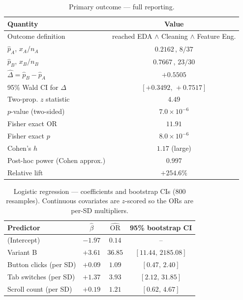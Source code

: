 \documentclass[11pt,a4paper]{article}
\begin{document}
\begin{table}[ht]
\centering\small
\renewcommand{\arraystretch}{1.15}
\caption{Primary outcome — full reporting.}
\begin{tabular}{@{}lc@{}}
\toprule
Quantity & Value \\
\midrule
Outcome definition              & reached EDA $\wedge$ Cleaning $\wedge$ Feature Eng. \\
$\hat p_A$, $x_A/n_A$           & $0.2162$\,, $8/37$ \\
$\hat p_B$, $x_B/n_B$           & $0.7667$\,, $23/30$ \\
$\hat\Delta = \hat p_B-\hat p_A$ & $+0.5505$ \\
95\% Wald CI for $\Delta$       & $[+0.3492,\, +0.7517]$ \\
Two-prop. $z$ statistic         & $4.49$ \\
$p$-value (two-sided)           & $7.0\times10^{-6}$ \\
Fisher exact OR                 & $11.91$ \\
Fisher exact $p$                & $8.0\times10^{-6}$ \\
Cohen's $h$                     & $1.17$ (large) \\
Post-hoc power (Cohen approx.)  & $0.997$ \\
Relative lift                   & $+254.6\%$ \\
\bottomrule
\end{tabular}
\end{table}

\begin{table}[ht]
\centering\small
\renewcommand{\arraystretch}{1.15}
\caption{Logistic regression — coefficients and bootstrap CIs
($800$ resamples). Continuous covariates are $z$-scored so the
ORs are per-SD multipliers.}
\begin{tabular}{@{}lccc@{}}
\toprule
\textbf{Predictor} & $\hat\beta$
                  & $\widehat{\text{OR}}$
                  & \textbf{95\% bootstrap CI} \\
\midrule
(Intercept)            & $-1.97$  & $0.14$  & --   \\
Variant B              & $+3.61$  & $36.85$ & $[11.44,\,2185.08]$ \\
Button clicks (per SD) & $+0.09$  & $1.09$  & $[0.47,\,2.40]$ \\
Tab switches (per SD)  & $+1.37$  & $3.93$  & $[2.12,\,31.85]$ \\
Scroll count (per SD)  & $+0.19$  & $1.21$  & $[0.62,\,4.67]$ \\
\bottomrule
\end{tabular}
\end{table}
\end{document}
